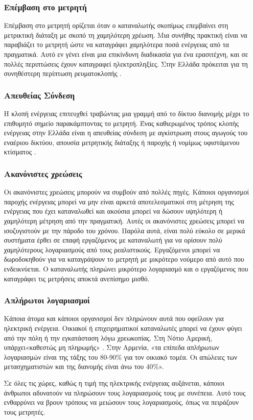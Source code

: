 \subsubsection{Επέμβαση στο μετρητή}
Επέμβαση στο μετρητή ορίζεται όταν ο καταναλωτής σκοπίμως επεμβαίνει στη μετρικτική διάταξη με σκοπό τη χαμηλότερη χρέωση. Μια συνήθης πρακτική είναι να παραβιάζει το μετρητή ώστε να καταγράφει χαμηλότερα ποσά ενέργειας από τα πραγματικά. Αυτό εν γένει είναι μια  επικίνδυνη διαδικασία για ένα ερασιτέχνη, και σε πολλές περιπτώσεις έχουν καταγραφεί ηλεκτροπληξίες. Στην Ελλάδα πρόκειται για τη συνηθέστερη περίπτωση ρευματοκλοπής \cite{rae}.
\subsubsection{Απευθείας Σύνδεση}
Η κλοπή ενέργειας επιτευχθεί τραβώντας μια γραμμή από το δίκτυο διανομής μέχρι το επιθυμητό σημείο παρακάμπτοντας το μετρητή. Ένας καθιερωμένος τρόπος κλοπής ενέργειας στην Ελλάδα είναι η απευθείας σύνδεση με αγκίστρωση στους αγωγούς του εναέριου δικτύου, απουσία μετρητικής διάταξης ή παροχής ή νομίμως υφιστάμενου κτίσματος \cite{rae}.
\subsubsection{Ακανόνιστες χρεώσεις}
Οι ακανόνιστες χρεώσεις μπορούν να συμβούν από πολλές πηγές. Κάποιοι οργανισμοί παροχής ενέργειας μπορεί να μην είναι αρκετά αποτελεσματικοί στη μέτρηση της ενέργειας που έχει καταναλωθεί και ακούσια μπορεί να δώσουν υψηλότερη ή χαμηλότερη μέτρηση από την πραγματική. Αυτές οι ακανόνιστες χρεώσεις μπορεί να ισοζυγιστούν με την πάροδο του χρόνου. Παρόλα αυτά, είναι πολύ εύκολο σε μερικά συστήματα έρθει σε επαφή εργαζόμενος με καταναλωτή για να ορίσουν  πολύ χαμηλότερους λογαριασμούς από τους ρεαλιστικούς. Εργαζόμενοι μπορεί να δωροδοκηθούν για να καταγράψουν το μετρητή με μικρότερο νούμερο από αυτό που ενδεικνύεται. Ο καταναλωτής πληρώνει μικρότερο λογαριασμό και ο εργαζόμενος που καταγράφει τις μετρήσεις αποκτά ανεπίσημο μισθό.
\subsubsection{Απλήρωτοι λογαριασμοί}
Κάποια άτομα και κάποιοι οργανισμοί δεν πληρώνουν αυτά που οφείλουν για ηλεκτρική ενέργεια. Οικιακοί ή επιχειρηματικοί καταναλωτές  μπορεί να έχουν φύγει από την πόλη ή την εγκατάσταση λόγω χρεωκοπίας. Στη Νότιο Αμερική, υπάρχει«καθεστώς μη πληρωμής» \cite{mkhwanazi}. Στην Αρμενία, «τα επίπεδα απλήρωτων λογαριασμών είναι της τάξης του 80-90\% για τον οικιακό τομέα. Οι απώλειες των μετασχηματιστών και της διανομής είναι άνω του 40\%»\cite{tacis}.\par
Σε όλες τις χώρες, καθώς η τιμή της ηλεκτρικής ενέργειας αυξάνεται, κάποιοι άνθρωποι αδυνατούν να πληρώσουν τους λογαριασμούς τους με συνέπεια. Αυτό τους ενθαρρύνει να βρουν τρόπους να μειώσουν τους λογαριασμούς, όπως να πειράζουν τους μετρητές.
